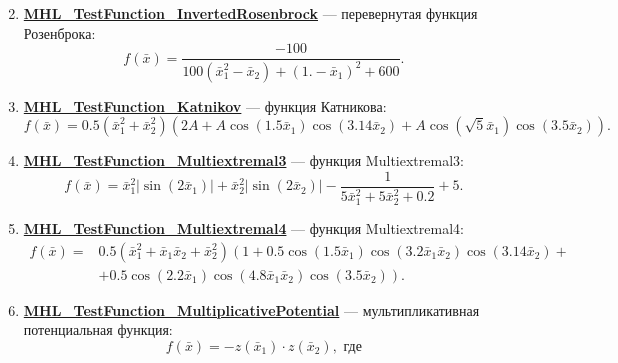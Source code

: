 \begin{enumerate}
\begin{equation}
 \end{equation}
 \item \hyperref[TestFunctions:section:MHL_TestFunction_InvertedRosenbrock]{\textbf{MHL\_TestFunction\_InvertedRosenbrock}} --- перевернутая функция Розенброка:
 \begin{equation}
 f\left( \bar{x}\right) =\dfrac{-100}{100\left( \bar{x}_1^2-\bar{x}_2\right) +\left( 1.-\bar{x}_1\right)^2+600}.
 \end{equation}
 \item \hyperref[TestFunctions:section:MHL_TestFunction_Katnikov]{\textbf{MHL\_TestFunction\_Katnikov}} --- функция Катникова:
 \begin{equation}
 f\left( \bar{x}\right) = 0.5\left( \bar{x}_1^2+\bar{x}_2^2\right) \left( 2A+A\cos\left( 1.5\bar{x}_1\right)\cos\left( 3.14\bar{x}_2\right)+A\cos\left( \sqrt{5}\bar{x}_1\right)\cos\left( 3.5\bar{x}_2\right)    \right).
 \end{equation}
 \item \hyperref[TestFunctions:section:MHL_TestFunction_Multiextremal3]{\textbf{MHL\_TestFunction\_Multiextremal3}} --- функция Multiextremal3:
 \begin{equation}
 f\left( \bar{x}\right) = \bar{x}_1^2\left| \sin\left( 2\bar{x}_1\right) \right| +\bar{x}_2^2\left| \sin\left( 2\bar{x}_2\right) \right| -\dfrac{1}{5\bar{x}_1^2+5\bar{x}_2^2+0.2} + 5.
 \end{equation}
 \item \hyperref[TestFunctions:section:MHL_TestFunction_Multiextremal4]{\textbf{MHL\_TestFunction\_Multiextremal4}} --- функция Multiextremal4:
 \begin{align}
 f\left( \bar{x}\right) =& 0.5\left( \bar{x}_1^2+\bar{x}_1\bar{x}_2 +\bar{x}_2^2\right) \left( 1+0.5\cos\left(1.5\bar{x}_1\right)\cos\left(3.2\bar{x}_1\bar{x}_2\right)\cos\left(3.14\bar{x}_2\right)  +\right. \\
  & \left.+0.5\cos\left(2.2\bar{x}_1\right)\cos\left(4.8\bar{x}_1\bar{x}_2\right)\cos\left(3.5\bar{x}_2\right)\right).\nonumber
 \end{align}
 \item \hyperref[TestFunctions:section:MHL_TestFunction_MultiplicativePotential]{\textbf{MHL\_TestFunction\_MultiplicativePotential}} --- мультипликативная потенциальная функция:
 \begin{equation}
 f\left( \bar{x}\right) = -z\left( \bar{x}_1\right)\cdot z\left( \bar{x}_2\right), \text{ где}
 \end{equation}
 \begin{equation*}

\end{equation*}
\end{enumerate}
